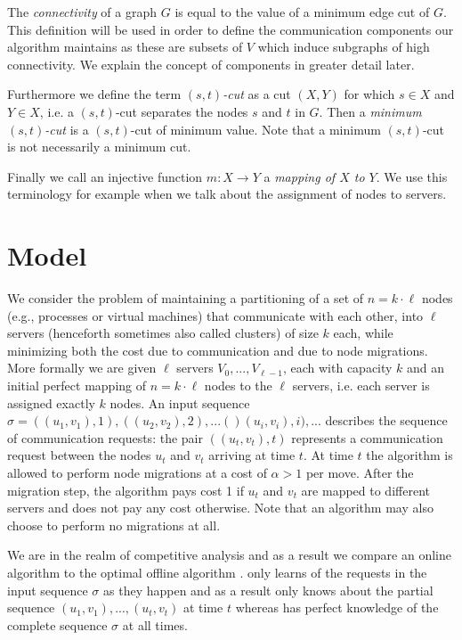 \documentclass[a4paper,UKenglish,cleveref, autoref, thm-restate,authorcolumns]{../lipics/lipics-v2019}
\newcommand{\opt}{\text{O{\scriptsize PT}}}
\newcommand{\onl}{\text{O{\scriptsize NL}}}
\begin{document}
The \textit{connectivity} of a graph $G$ is equal to the value of a minimum edge cut of $G$. This definition will be used in order to define the communication components our algorithm maintains as these are subsets of $V$ which induce subgraphs of high connectivity. We explain the concept of components in greater detail later.

Furthermore we define the term $(s,t)$\textit{-cut} as a cut $(X,Y)$ for which $s\in X$ and $Y\in X$, i.e. a $(s,t)$-cut separates the nodes $s$ and $t$ in $G$. Then a \textit{minimum $(s,t)$-cut} is a $(s,t)$-cut of minimum value. Note that a minimum $(s,t)$-cut is not necessarily a minimum cut.

Finally we call an injective function $m:X\rightarrow Y$ a \textit{mapping of $X$ to $Y$}. We use this terminology for example when we talk about the assignment of nodes to servers.

\sloppy

\section{Model}
\label{problem_definition_section}

We consider the problem of maintaining a partitioning of a 
set of $n=k\cdot \ell$ nodes (e.g., processes or virtual machines) 
that communicate with each other, 
into $\ell$ servers (henceforth sometimes also called clusters) of size $k$ each, 
while minimizing both the cost due to communication and due to node migrations. 
More formally we are given $\ell$ servers $V_0,...,V_{\ell-1}$, 
each with capacity $k$ and an initial perfect mapping of $n=k\cdot \ell$ nodes to the $\ell$ servers, 
i.e. each server is assigned exactly $k$ nodes. An input sequence $\sigma=((u_1, v_1),1), ((u_2, v_2),2),...()(u_i,v_i),i),...$ describes 
the sequence of communication requests: the pair $((u_t, v_t),t)$ represents a communication request between the nodes 
$u_t$ and $v_t$ arriving at time $t$. At time $t$ the algorithm is allowed to perform node migrations at a cost of $\alpha>1$ per move. 
After the migration step, the algorithm pays cost 1 if $u_t$ and $v_t$ are mapped to different servers and does not pay any cost otherwise. Note that an algorithm may also choose to perform no migrations at all.

We are in the realm of competitive analysis and as a result we compare an online algorithm \onl{} to the optimal offline algorithm \opt{}. \onl{} only learns of the requests in the input sequence $\sigma$ as they happen and as a result only knows about the partial sequence $(u_1,v_1),...,(u_t,v_t)$ at time $t$ whereas \opt{} has perfect knowledge of the complete sequence $\sigma$ at all times.
\end{document}
